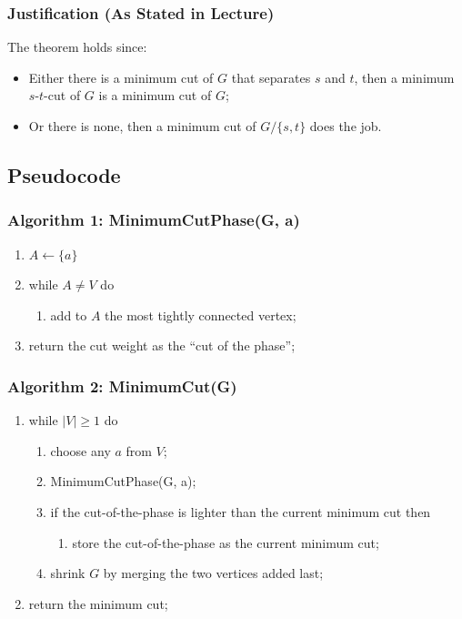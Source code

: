 \documentclass[12pt]{article}
\begin{document}
\subsubsection*{Justification (As Stated in Lecture)}

The theorem holds since:

\begin{itemize}
\item Either there is a minimum cut of \( G \) that separates \( s \) and \( t \), then a minimum \( s\text{-}t \)-cut of \( G \) is a minimum cut of \( G \);
\item Or there is none, then a minimum cut of \( G/\{s, t\} \) does the job.
\end{itemize}

\subsection{Pseudocode}

\subsubsection*{Algorithm 1: MinimumCutPhase(G, a)}

\begin{enumerate}
\item \( A \leftarrow \{a\} \)
\item while \( A \neq V \) do
\begin{enumerate}
\item add to \( A \) the most tightly connected vertex;
\end{enumerate}
\item return the cut weight as the ``cut of the phase'';
\end{enumerate}

\subsubsection*{Algorithm 2: MinimumCut(G)}

\begin{enumerate}
\item while \( |V| \ge 1 \) do
\begin{enumerate}
\item choose any \( a \) from \( V \);
\item MinimumCutPhase(G, a);
\item if the cut-of-the-phase is lighter than the current minimum cut then
\begin{enumerate}
\item store the cut-of-the-phase as the current minimum cut;
\end{enumerate}
\item shrink \( G \) by merging the two vertices added last;
\end{enumerate}
\item return the minimum cut;
\end{enumerate}
\end{document}
